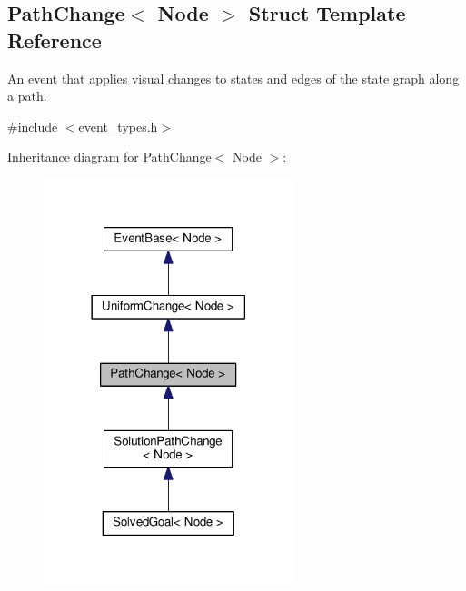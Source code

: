 \hypertarget{structPathChange}{}\subsection{Path\+Change$<$ Node $>$ Struct Template Reference}
\label{structPathChange}


An event that applies visual changes to states and edges of the state graph along a path.  




{\ttfamily \#include $<$event\+\_\+types.\+h$>$}



Inheritance diagram for Path\+Change$<$ Node $>$\+:\nopagebreak
\begin{figure}[H]
\begin{center}
\leavevmode
\includegraphics[width=206pt]{structPathChange__inherit__graph}
\end{center}
\end{figure}


